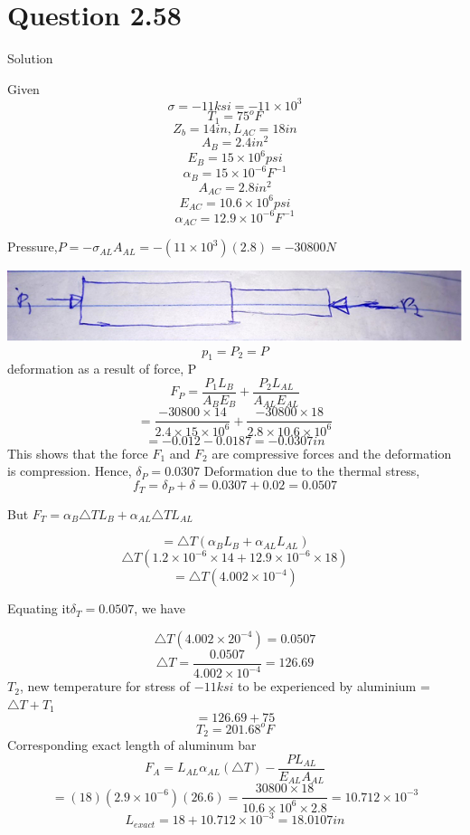 \documentclass{article}
\begin{document}
\section*{Question 2.58}
\begin{center} Solution\end{center}
Given \[\sigma = -11ksi = -11\times 10^{3}\]
\[T_{1} = 75^{o}F\]
\[Z_{b} = 14in, L_{AC} = 18in\]
\[A_{B} = 2.4in^{2}\]
\[E_{B} = 15\times10^{6}psi\]
\[\alpha_{B}=15\times10^{-6}F^{-1}\]
\[A_{AC} = 2.8in^{2}\]
\[E_{AC} = 10.6\times10^{6}psi\]
\[\alpha_{AC}=12.9\times10^{-6}F^{-1}\]
\begin{center}Pressure,$P = -\sigma_{AL}A_{AL}=- (11\times10^{3})(2.8) = -30800N$\end{center}
\includegraphics{10}
\[p_{1} = P_{2} = P\]
deformation as a result of force, P
\[F_{P} = \frac{P_{1}L_{B}}{A_{B}E_{B}} + \frac{P_{2}L_{AL}}{A_{AL}E_{AL}}\]
\[=\frac{-30800\times14}{2.4\times15\times10^{6}} + \frac{-30800\times18}{2.8\times10.6\times10^{6}}\]
\[=-0.012 - 0.0187 = -0.0307in\]
This shows that the force $F_{1}$ and $F_{2}$ are compressive forces and the deformation is compression.
\newline
Hence, $\delta_{P} = 0.0307$
Deformation due to the thermal stress,
\[f_{T} = \delta_{P}+\delta = 0.0307 + 0.02 = 0.0507\]
\begin{center}But $F_{T} = \alpha_{B}\triangle T L_{B} +  \alpha_{AL}\triangle T L_{AL}$\end{center}
\[= \triangle T( \alpha_{B} L_{B} +  \alpha_{AL} L_{AL})\]
\[\triangle T(1.2\times 10^{-6}\times14 + 12.9\times10^{-6}\times18)\]
\[=\triangle T(4.002\times10^{-4})\]
\begin{center} Equating it$ \delta_{T} = 0.0507$, we have\end{center}
\[\triangle T(4.002\times20^{-4}) = 0.0507\]
\[\triangle T = \frac{0.0507}{4.002\times10^{-4}} = 126.69\]
$T_{2}$, new temperature for stress of $-11ksi$ to be experienced by aluminium = $\triangle T +T_{1}$
\[=126.69 + 75\]
\[T_{2} = 201.68^{o}F\]
\newline
\newline
Corresponding exact length of aluminum bar
\[F_{A} = L_{AL}\alpha_{AL}(\triangle T) - \frac{PL_{AL}}{E_{AL}A_{AL}}\]
\[=(18)(2.9\times10^{-6})(26.6) = \frac{30800\times 18}{10.6\times10^{6}\times2.8} = 10.712\times10^{-3}\]
\[L_{exact} = 18 + 10.712\times 10^{-3} = 18.0107in\]
\end{document}
